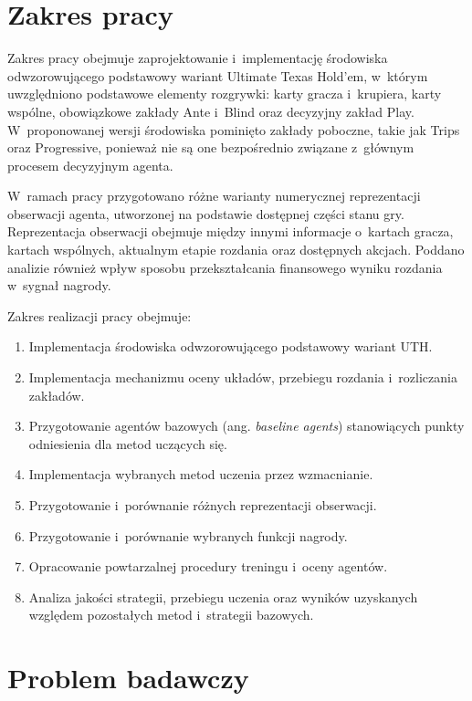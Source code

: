 \section{Zakres pracy}

Zakres pracy obejmuje zaprojektowanie i~implementację środowiska
odwzorowującego podstawowy wariant Ultimate Texas Hold’em, w~którym
uwzględniono podstawowe elementy
rozgrywki: karty gracza i~krupiera, karty wspólne, obowiązkowe zakłady Ante
i~Blind oraz decyzyjny zakład Play. W~proponowanej wersji środowiska pominięto
zakłady poboczne, takie jak Trips oraz Progressive, ponieważ nie są one
bezpośrednio związane z~głównym procesem decyzyjnym agenta.

W~ramach pracy przygotowano różne warianty numerycznej reprezentacji
obserwacji agenta, utworzonej na podstawie dostępnej części stanu gry.
Reprezentacja obserwacji obejmuje między innymi informacje o~kartach
gracza, kartach wspólnych, aktualnym etapie rozdania oraz dostępnych akcjach.
Poddano analizie również wpływ sposobu przekształcania finansowego
wyniku rozdania w~sygnał nagrody.

Zakres realizacji pracy obejmuje:

\begin{enumerate}
    \item Implementacja środowiska odwzorowującego podstawowy wariant
          UTH.
    \item Implementacja mechanizmu oceny układów, przebiegu rozdania
          i~rozliczania zakładów.
    \item Przygotowanie agentów bazowych (ang. \textit{baseline agents}) stanowiących punkty odniesienia
          dla metod uczących się.
    \item Implementacja wybranych metod uczenia przez wzmacnianie.
    \item Przygotowanie i~porównanie różnych reprezentacji obserwacji.
    \item Przygotowanie i~porównanie wybranych funkcji nagrody.
    \item Opracowanie powtarzalnej procedury treningu i~oceny agentów.
    \item Analiza jakości strategii, przebiegu uczenia oraz wyników uzyskanych
          względem pozostałych metod i~strategii bazowych.
\end{enumerate}

\section{Problem badawczy}


